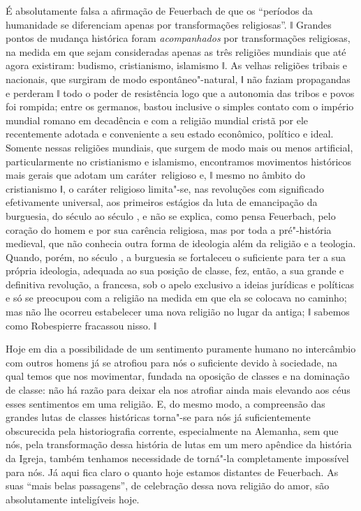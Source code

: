 É absolutamente falsa a afirmação
de Feuerbach
de que os ``períodos da humanidade se diferenciam apenas por
transformações religiosas''. ǁ Grandes pontos de mudança histórica
foram \emph{acompanhados }por transformações religiosas, na medida em
que sejam consideradas apenas as três religiões mundiais que até agora
existiram: budismo, cristianismo, islamismo ǁ. As velhas religiões
tribais e nacionais, que surgiram de modo espontâneo"-natural, ǁ não
faziam propagandas e perderam ǁ todo o poder de resistência logo que a
autonomia das tribos e povos foi rompida; entre os germanos, bastou
inclusive o simples contato com o império mundial romano em decadência e
com a religião mundial cristã por ele recentemente adotada e conveniente
a seu estado econômico, político e ideal. Somente nessas religiões
mundiais, que surgem de modo mais ou menos artificial, particularmente
no cristianismo e islamismo, encontramos movimentos históricos mais
gerais que adotam um caráter\est\ religioso e, ǁ mesmo no âmbito do
cristianismo ǁ, o caráter religioso limita"-se, nas revoluções com
significado efetivamente universal, aos primeiros estágios da luta de
emancipação da burguesia, do século  ao século , e não se
explica, como pensa
Feuerbach,
pelo coração do homem e por sua carência religiosa, mas por toda a
pré"-história medieval, que não conhecia outra forma de ideologia além da
religião e a teologia. Quando, porém, no século , a burguesia se
fortaleceu o suficiente para ter a sua própria ideologia, adequada ao
sua posição de classe, fez, então, a sua grande e definitiva revolução,
a francesa, sob o apelo exclusivo a ideias jurídicas e políticas e só se
preocupou com a religião na medida em que ela se colocava no caminho;
mas não lhe ocorreu estabelecer uma nova religião no lugar da antiga; ǁ
sabemos como Robespierre fracassou nisso. ǁ

Hoje em dia a possibilidade de um sentimento puramente humano no
intercâmbio com outros homens já se atrofiou para nós o suficiente
devido à sociedade, na qual temos que nos movimentar, fundada na
oposição de classes e na dominação de classe: não há razão para deixar
ela nos atrofiar ainda mais elevando aos céus esses sentimentos em uma
religião. E, do mesmo modo, a compreensão das grandes lutas de classes
históricas torna"-se para nós já suficientemente obscurecida pela
historiografia corrente, especialmente na Alemanha, sem que nós, pela
transformação dessa história de lutas em um mero apêndice da história da
Igreja, também tenhamos necessidade de torná"-la completamente impossível
para nós. Já aqui fica claro o quanto hoje estamos distantes
de Feuerbach.
As suas ``mais belas passagens'', de celebração dessa nova religião do
amor, são absolutamente inteligíveis hoje.\est\

